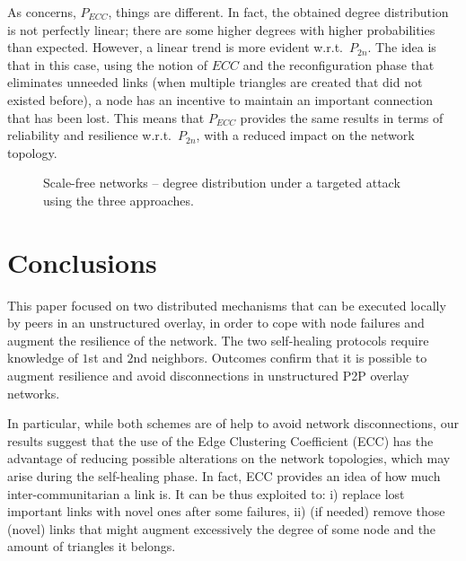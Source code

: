 \documentclass[10pt, conference, compsocconf]{IEEEtran}
\begin{document}
As concerns, $P_{ECC}$, things are different. In fact, the obtained degree distribution is not perfectly linear; there are some higher degrees with higher probabilities than expected. However, a linear trend is more evident w.r.t.~$P_{2n}$. The idea is that in this case, using the notion of $ECC$ and the reconfiguration phase that eliminates unneeded links (when multiple triangles are created that did not existed before), a node has an incentive to maintain an important connection that has been lost.
This means that $P_{ECC}$ provides the same results in terms of reliability and resilience w.r.t.~$P_{2n}$, with a reduced impact on the network topology.

\begin{figure*}[t]
   \centering
   \hspace{1.5cm}
   \hspace{1.5cm}
   \caption{Scale-free networks -- degree distribution under a targeted attack using the three approaches.}
   \label{fig:sf_deg_dist}
\end{figure*}



\section{Conclusions}\label{sec:conc}

This paper focused on two distributed mechanisms that can be executed locally by peers in an unstructured overlay, in order to cope with node failures and augment the resilience of the network.
The two self-healing protocols require knowledge of $1$st and $2$nd neighbors. 
Outcomes confirm that it is possible to augment resilience and avoid disconnections in unstructured P2P overlay networks. 

In particular, while both schemes are of help to avoid network disconnections, our results suggest that the use of the Edge Clustering Coefficient (ECC) has the advantage of reducing possible alterations on the network topologies, which may arise during the self-healing phase.
In fact, ECC provides an idea of how much inter-communitarian a link is. It can be thus exploited to: i) replace lost important links with novel ones after some failures, ii) (if needed) remove those (novel) links that might augment excessively the degree of some node and the amount of triangles it belongs. 
\end{document}
